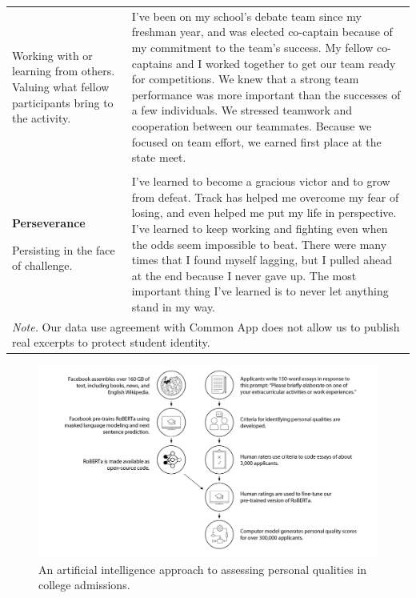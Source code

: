 \documentclass[11pt]{report}
\begin{document}
\begin{mainf}
\begin{table}
\begin{tabular}{  p{.275\linewidth}  p{.675\linewidth}}
Working with or learning from others. Valuing what fellow participants bring to the activity.                                                                                            & I’ve been on my school’s debate team since my freshman year, and was elected co-captain because of my commitment to the team’s success. My fellow co-captains and I worked together to get our team ready for competitions. We knew that a strong team performance was more important than the successes of a few individuals. We stressed teamwork and cooperation between our teammates. Because we focused on team effort, we earned first place at the state meet.             \\ \\
\textbf{Perseverance}

Persisting in the face of challenge.                                                                                                                                                      & I’ve learned to become a gracious victor and to grow from defeat. Track has helped me overcome my fear of losing, and even helped me put my life in perspective. I’ve learned to keep working and fighting even when the odds seem impossible to beat. There were many times that I found myself lagging, but I pulled ahead at the end because I never gave up. The most important thing I’ve learned is to never let anything stand in my way.     \\                         \hline    
\multicolumn{2}{l}{\textit{Note.} Our data use agreement with Common App does not allow us to publish real excerpts to protect student identity.}
\end{tabular}
\end{table}

\begin{figure}
    \centering
    \includegraphics[width= \textwidth]{fig1_new2_scale.pdf}
    \caption{An artificial intelligence approach to assessing personal qualities in college admissions.}
    \label{fig:f1}
\end{figure}


\end{mainf}
\end{document}
